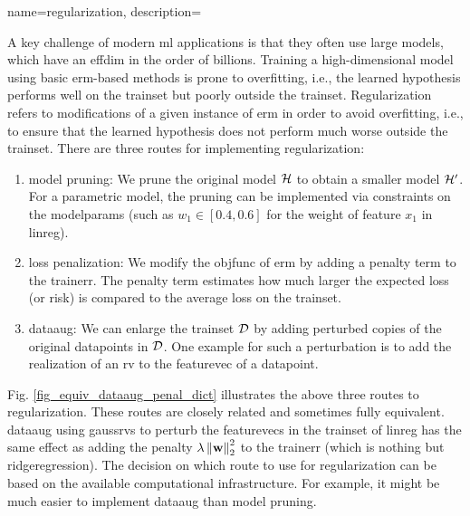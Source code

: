 {name={regularization}, 
	description={A key challenge of modern \gls{ml} applications is that they often 
		use large \glspl{model}, which have an \gls{effdim} in the order of billions. 
		Training a high-dimensional \gls{model} using basic \gls{erm}-based methods
		is prone to \gls{overfitting}, i.e., the learned \gls{hypothesis} performs well on the \gls{trainset} 
		but poorly outside the \gls{trainset}. Regularization refers to modifications of a given instance 
		of \gls{erm} in order to avoid \gls{overfitting}, i.e., to ensure that the learned \gls{hypothesis} does 
		not perform much worse outside the \gls{trainset}. There are three routes for implementing 
		regularization: 
		\begin{enumerate}[label=\arabic*)]
			\item {\Gls{model} pruning:} We prune the original \gls{model} $\mathcal{H}$ to obtain a 
			smaller \gls{model} $\mathcal{H}'$. For a parametric \gls{model}, the pruning can be 
			implemented via constraints on the \gls{modelparams} (such as $w_{1} \in [0.4,0.6]$ for 
			the weight of \gls{feature} $x_{1}$ in \gls{linreg}).
			\item {\Gls{loss} penalization:} We modify the \gls{objfunc} of \gls{erm} by adding a 
			penalty term to the \gls{trainerr}. The penalty term estimates how much larger the expected \gls{loss} (or \gls{risk}) 
			is compared to the average \gls{loss} on the \gls{trainset}. 
			\item {\Gls{dataaug}:} We can enlarge the \gls{trainset} $\mathcal{D}$ by adding 
			perturbed copies of the original \glspl{datapoint} in $\mathcal{D}$. One example for such 
			a perturbation is to add the \gls{realization} of an \gls{rv} to the \gls{featurevec} 
			of a \gls{datapoint}. 
		\end{enumerate} 
		Fig. \ref{fig_equiv_dataaug_penal_dict} illustrates the above three routes to regularization. 
		These routes are closely related and sometimes fully equivalent. \Gls{dataaug} using \glspl{gaussrv} 
		to perturb the \glspl{featurevec} in the \gls{trainset} of \gls{linreg} 
		has the same effect as adding the penalty 
		$\lambda \left\Vert {{\bf w}} \right\Vert_{2}^2$ to the \gls{trainerr} (which is nothing but \gls{ridgeregression}). 
        		The decision on which route to use for regularization can be based on the 
        		available computational infrastructure. For example, it might be much easier to 
        		implement \gls{dataaug} than \gls{model} pruning. 
		\begin{figure}[H]

\end{figure}}}
